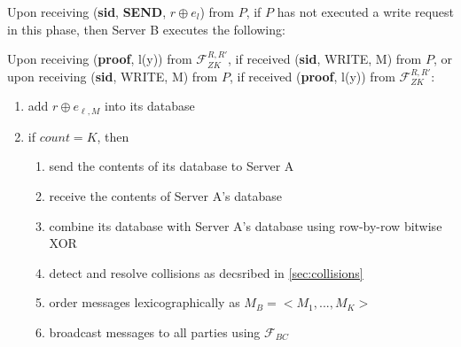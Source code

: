 \begin{tcolorbox}[colback=white, arc=5pt]

\extitem Upon receiving (\textbf{sid}, \textbf{SEND}, $r\oplus e_l$) from $P$, if $P$ has not executed a write request in this phase, then
    Server B executes the following:
    
    
    Upon receiving (\textbf{proof}, l(y)) from $\mathcal{F}_{ZK}^{R,R'}$, if received (\textbf{sid}, WRITE, M) from $P$, or upon receiving (\textbf{sid}, WRITE, M) from $P$, if received (\textbf{proof}, l(y)) from $\mathcal{F}_{ZK}^{R,R'}$:
    \begin{enumerate}
        \item add $r\oplus e_{\ell,M}$ into its database  
        \item if $count=K$, then
        \begin{enumerate}
            \item send the contents of its database to Server A
            \item receive the contents of Server A's database
            \item combine its database with Server A's database using row-by-row bitwise XOR
            \item detect and resolve collisions as decsribed in \ref{sec:collisions}
            \item order messages lexicographically as $M_B=<M_1,...,M_K>$
            \item broadcast messages to all parties using $\mathcal{F}_{BC}$
        \end{enumerate}
    \end{enumerate}



\end{tcolorbox}
